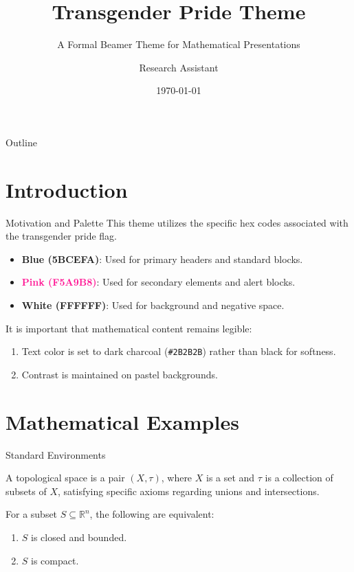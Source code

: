 \documentclass[aspectratio=169, 10pt]{beamer}
\title{Transgender Pride Theme}
\subtitle{A Formal Beamer Theme for Mathematical Presentations}
\author{Research Assistant}
\institute{Department of Mathematics}
\date{\today}
\begin{document}
\begin{frame}[plain]
    \titlepage
\end{frame}

\begin{frame}{Outline}
    \tableofcontents
\end{frame}

\section{Introduction}

\begin{frame}{Motivation and Palette}
    This theme utilizes the specific hex codes associated with the transgender pride flag.
    \begin{itemize}
        \item \textcolor{DeepBlue}{\textbf{Blue (5BCEFA)}}: Used for primary headers and standard blocks.
        \item \textcolor{DeepPink}{\textbf{Pink (F5A9B8)}}: Used for secondary elements and alert blocks.
        \item \textcolor{DarkText}{\textbf{White (FFFFFF)}}: Used for background and negative space.
    \end{itemize}
    
    \vspace{0.5cm}
    It is important that mathematical content remains legible:
    \begin{enumerate}
        \item Text color is set to dark charcoal (\texttt{\#2B2B2B}) rather than black for softness.
        \item Contrast is maintained on pastel backgrounds.
    \end{enumerate}
\end{frame}

\section{Mathematical Examples}

\begin{frame}{Standard Environments}
    \begin{definition}
        A topological space is a pair $(X, \tau)$, where $X$ is a set and $\tau$ is a collection of subsets of $X$, satisfying specific axioms regarding unions and intersections.
    \end{definition}

    \begin{theorem}
        For a subset $S \subseteq \mathbb{R}^n$, the following are equivalent:
        \begin{enumerate}
            \item $S$ is closed and bounded.
            \item $S$ is compact.
        \end{enumerate}
    \end{theorem}
\end{frame}
\end{document}
